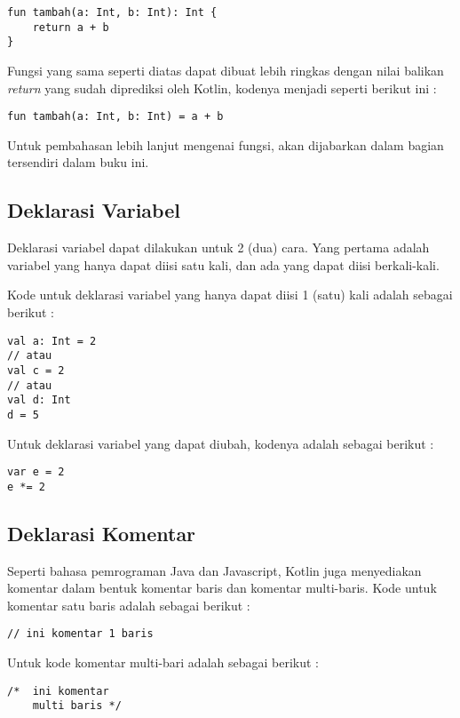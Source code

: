 \begin{lstlisting}
fun tambah(a: Int, b: Int): Int {
	return a + b
}
\end{lstlisting}

Fungsi yang sama seperti diatas dapat dibuat lebih ringkas dengan nilai balikan \textit{return} yang sudah diprediksi oleh Kotlin, kodenya menjadi seperti berikut ini :

\begin{lstlisting}
fun tambah(a: Int, b: Int) = a + b
\end{lstlisting}

Untuk pembahasan lebih lanjut mengenai fungsi, akan dijabarkan dalam bagian tersendiri dalam buku ini.

\subsection{Deklarasi Variabel}

Deklarasi variabel dapat dilakukan untuk 2 (dua) cara. Yang pertama adalah variabel yang hanya dapat diisi satu kali, dan ada yang dapat diisi berkali-kali. 

Kode untuk deklarasi variabel yang hanya dapat diisi 1 (satu) kali adalah sebagai berikut :

\begin{lstlisting}
val a: Int = 2 
// atau 
val c = 2
// atau
val d: Int
d = 5
\end{lstlisting}

Untuk deklarasi variabel yang dapat diubah, kodenya adalah sebagai berikut :

\begin{lstlisting}
var e = 2
e *= 2
\end{lstlisting}

\subsection{Deklarasi Komentar}

Seperti bahasa pemrograman Java dan Javascript, Kotlin juga menyediakan komentar dalam bentuk komentar baris dan komentar multi-baris. Kode untuk komentar satu baris adalah sebagai berikut :

\begin{lstlisting}
// ini komentar 1 baris
\end{lstlisting}

Untuk kode komentar multi-bari adalah sebagai berikut :

\begin{lstlisting}
/*  ini komentar
    multi baris */
\end{lstlisting}

